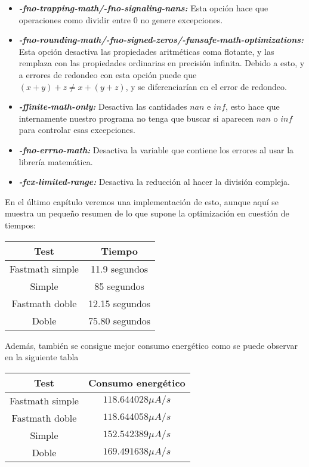 \begin{itemize}
	\item \textbf{\textit{-fno-trapping-math/-fno-signaling-nans: }} Esta opción hace que operaciones como dividir entre $0$ no genere excepciones.
	
	\item \textbf{\textit{-fno-rounding-math/-fno-signed-zeros/-funsafe-math-optimizations: }} Esta opción desactiva las propiedades aritméticas coma flotante, y las remplaza con las propiedades ordinarias en precisión infinita. Debido a esto, y a errores de redondeo con esta opción puede que $(x+y)+z \neq x + (y+z)$, y se diferenciarían en el error de redondeo.
	
	\item \textbf{\textit{-ffinite-math-only: }} Desactiva las cantidades $nan$ e $inf$, esto hace que internamente nuestro programa no tenga que buscar si aparecen $nan$ o $inf$ para controlar esas excepciones.
	
	\item \textbf{\textit{-fno-errno-math: }} Desactiva la variable que contiene los errores al usar la librería matemática.
	
	\item \textbf{\textit{-fcx-limited-range: }} Desactiva la reducción al hacer la división compleja.
\end{itemize}

En el último capítulo veremos una implementación de esto, aunque aquí se muestra un pequeño resumen de lo que supone la optimización en cuestión de tiempos:

\begin{table}[H]
	\centering
	\begin{tabular}{|c|c|}
		\hline
		\textbf{Test}  & \textbf{Tiempo}        \\ \hline
		Fastmath simple & 11.9 segundos \\ 
		Simple     & 85 segundos    \\
		Fastmath doble   & 12.15 segundos    \\
		Doble   & 75.80 segundos \\ \hline
	\end{tabular}%
\end{table}
Además, también se consigue mejor consumo energético como se puede observar en la siguiente tabla
\begin{table}[H]
	\centering
	\begin{tabular}{|c|c|}
		\hline
		\textbf{Test}  & \textbf{Consumo energético}        \\ \hline
		Fastmath simple & $118.644028 \mu A/s$ \\ 
		Fastmath doble   & $118.644058 \mu A/s$ \\
		Simple & $ 152.542389 \mu A/s$ \\
		Doble & $ 169.491638 \mu A/s$ \\
		\hline
	\end{tabular}%
\end{table}

